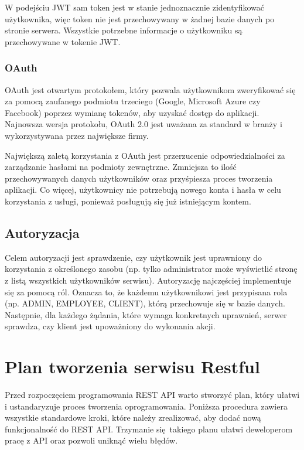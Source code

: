 \begin{itemize}
			W podejściu JWT sam token jest w stanie jednoznacznie zidentyfikować użytkownika, więc token nie jest przechowywany w żadnej bazie danych po stronie serwera. Wszystkie potrzebne informacje o użytkowniku są przechowywane w tokenie JWT.
			
			\subsubsection{OAuth}
			OAuth jest otwartym protokołem, który pozwala użytkownikom zweryfikować się za pomocą zaufanego podmiotu trzeciego (Google, Microsoft Azure czy Facebook) poprzez wymianę tokenów, aby uzyskać dostęp do aplikacji. Najnowsza wersja protokołu, OAuth 2.0 jest uważana za standard w branży i wykorzystywana przez największe firmy.
			
			Największą zaletą korzystania z OAuth jest przerzucenie odpowiedzialności za zarządzanie hasłami na podmioty zewnętrzne. Zmniejsza to ilość przechowywanych danych użytkowników oraz przyśpiesza proces tworzenia aplikacji. Co więcej, użytkownicy nie potrzebują nowego konta i hasła w celu korzystania z usługi, ponieważ posługują się już istniejącym kontem. 
		\end{itemize}
	
	\subsection{Autoryzacja}
		Celem autoryzacji jest sprawdzenie, czy użytkownik jest uprawniony do korzystania z określonego zasobu (np. tylko administrator może wyświetlić stronę z listą wszystkich użytkowników serwisu). Autoryzację najczęściej implementuje się za pomocą ról. Oznacza to, że każdemu użytkownikowi jest przypisana rola (np. ADMIN, EMPLOYEE, CLIENT), którą przechowuje się w bazie danych. Następnie, dla każdego żądania, które wymaga konkretnych uprawnień, serwer sprawdza, czy klient jest upoważniony do wykonania akcji.

\section{Plan tworzenia serwisu Restful \cite{RESTfulWebServices}}
	Przed rozpoczęciem programowania REST API warto stworzyć plan, który ułatwi i ustandaryzuje proces tworzenia oprogramowania. Poniższa procedura zawiera wszystkie standardowe kroki, które należy zrealizować, aby dodać nową funkcjonalność do REST API. Trzymanie się takiego planu ułatwi deweloperom pracę z API oraz pozwoli uniknąć wielu błędów.
	
